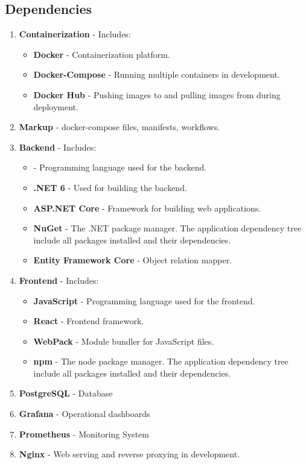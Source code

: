 \subsection{Dependencies}
\label{app:dependencies}
\begin{enumerate}
    \item \textbf{Containerization} - Includes:
    \begin{itemize}
        \item \textbf{Docker} - Containerization platform.
        \item \textbf{Docker-Compose} - Running multiple containers in development.
        \item \textbf{Docker Hub} - Pushing images to and pulling images from during deployment.
    \end{itemize}
    \item \textbf{Markup} - docker-compose files, manifests, workflows.
    \item \textbf{Backend} - Includes:
    \begin{itemize}
        \item \textbf{} - Programming language used for the backend.
        \item \textbf{.NET 6} - Used for building the backend.
        \item \textbf{ASP.NET Core} - Framework for building web applications.
        \item \textbf{NuGet} - The .NET package manager. The application dependency tree include all packages installed and their dependencies.
        \item \textbf{Entity Framework Core} - Object relation mapper.
    \end{itemize}
    \item \textbf{Frontend} - Includes:
    \begin{itemize}
        \item \textbf{JavaScript} - Programming language used for the frontend.
        \item \textbf{React} - Frontend framework.
        \item \textbf{WebPack} - Module bundler for JavaScript files.
        \item \textbf{npm} - The node package manager. The application dependency tree include all packages installed and their dependencies.
    \end{itemize}
    \item \textbf{PostgreSQL} - Database
    \item \textbf{Grafana} - Operational dashboards
    \item \textbf{Prometheus} - Monitoring System
    \item \textbf{Nginx} - Web serving and reverse proxying in development.
    

\end{enumerate}
